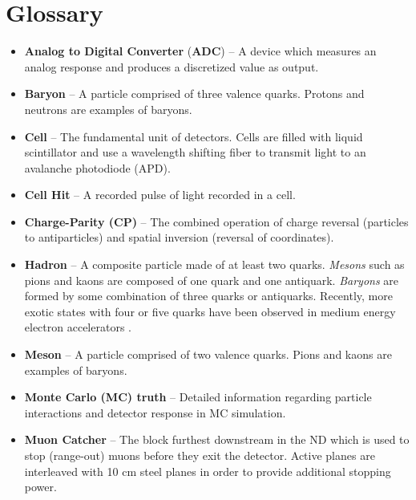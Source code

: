 \section{Glossary}
\label{jargonapp}
\begin{itemize}

\item \textbf{Analog to Digital Converter} (\textbf{ADC}) -- A device which measures an analog response and produces a discretized value as output.

\item \textbf{Baryon} -- A particle comprised of three valence
quarks.  Protons and neutrons are examples of baryons.

\item \textbf{Cell} -- The fundamental unit of \nova detectors.  Cells
are filled with liquid scintillator and use a wavelength shifting fiber
to transmit light to an avalanche photodiode (APD).

\item \textbf{Cell Hit} -- A recorded pulse of light recorded in a \nova cell.

\item \textbf{Charge-Parity (CP)} -- The combined operation of charge
reversal (particles to antiparticles) and spatial inversion (reversal of
coordinates).

\item \textbf{Hadron} -- A composite particle made of at least two quarks.  \textit{Mesons} such as pions and kaons are composed of one quark and one antiquark.  \textit{Baryons} are formed by some combination of three quarks or antiquarks.  Recently, more exotic states with four or five quarks have been observed in medium energy electron accelerators \cite{dias2013z_,barth2003evidence}.

\item \textbf{Meson} -- A particle comprised of two valence
quarks.  Pions and kaons are examples of baryons.

\item \textbf{Monte Carlo (MC) truth} -- Detailed information regarding
particle interactions and detector response in MC simulation.

\item \textbf{Muon Catcher} -- The block furthest downstream in the \nova
ND which is used to stop (range-out) muons before they exit the detector.
Active \nova planes are interleaved with 10 cm steel planes in order to provide
additional stopping power.


\end{itemize}
